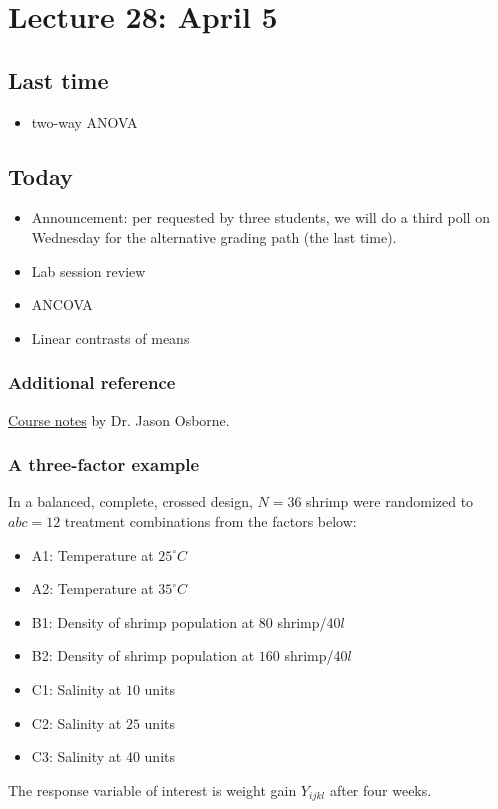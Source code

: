 \setcounter{section}{27}

\section{Lecture 28: April 5}


\subsection*{Last time}
\begin{itemize}
	\item two-way ANOVA
\end{itemize}


\subsection*{Today}
\begin{itemize}
	\item Announcement: per requested by three students, we will do a third poll on Wednesday for the alternative grading path (the last time).
	\item Lab session review
	\item ANCOVA
	\item Linear contrasts of means
\end{itemize}

\subsubsection*{Additional reference}
\href{https://www4.stat.ncsu.edu/~osborne/st512r/handouts/allpackets.pdf}{Course notes} by Dr. Jason Osborne.

\subsubsection*{A three-factor example}
In a balanced, complete, crossed design, $N=36$ shrimp were randomized to $abc = 12$ treatment combinations from the factors below:
\begin{itemize}
	\item A1: Temperature at $25^{\circ}C$
	\item A2: Temperature at $35^{\circ}C$
	\item B1: Density of shrimp population at $80$ shrimp/40$l$
	\item B2: Density of shrimp population at $160$ shrimp/40$l$
	\item C1: Salinity at $10$ units
	\item C2: Salinity at $25$ units
	\item C3: Salinity at $40$ units
\end{itemize}
The response variable of interest is weight gain $Y_{ijkl}$ after four weeks.

